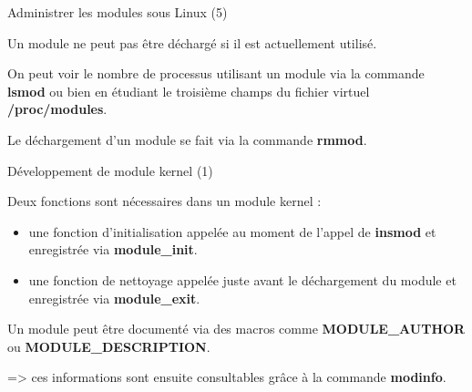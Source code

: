 \documentclass[12pt, t]{beamer}
\newcommand{\bi}{\begin{itemize}}
\newcommand{\ei}{\end{itemize}}
\begin{document}
\begin{frame}{Administrer les modules sous Linux (5)}

    \vspace{20pt}
    Un module ne peut pas être déchargé si il est actuellement utilisé.

    {
        \vspace{20pt} On peut voir le nombre de processus utilisant un module via
        la commande {\textbf{lsmod}} ou bien en étudiant le troisième champs du
        fichier virtuel {\textbf{/proc/modules}}.
    }

    {
        \vspace{20pt}
        Le déchargement d'un module se fait via la commande {\textbf{rmmod}}.
    }

\end{frame}

\begin{frame}{Développement de module kernel (1)}

    \vspace{10pt}
    Deux fonctions sont nécessaires dans un module kernel :
    \bi
    \itemsep8pt
    \item une fonction d'initialisation appelée au moment de l'appel de
        {\textbf{insmod}} et enregistrée via {\textbf{module\_init}}.
    \item une fonction de nettoyage appelée juste avant le déchargement du
          module et enregistrée via {\textbf{module\_exit}}.
    \ei

    {
        \vspace{10pt}
        Un module peut être documenté via des macros comme
        {\textbf{MODULE\_AUTHOR}} ou {\textbf{MODULE\_DESCRIPTION}}.

        \vspace{10pt}
        => ces informations sont ensuite consultables grâce à la commande
        {\textbf{modinfo}}.
    }

\end{frame}

\end{document}

